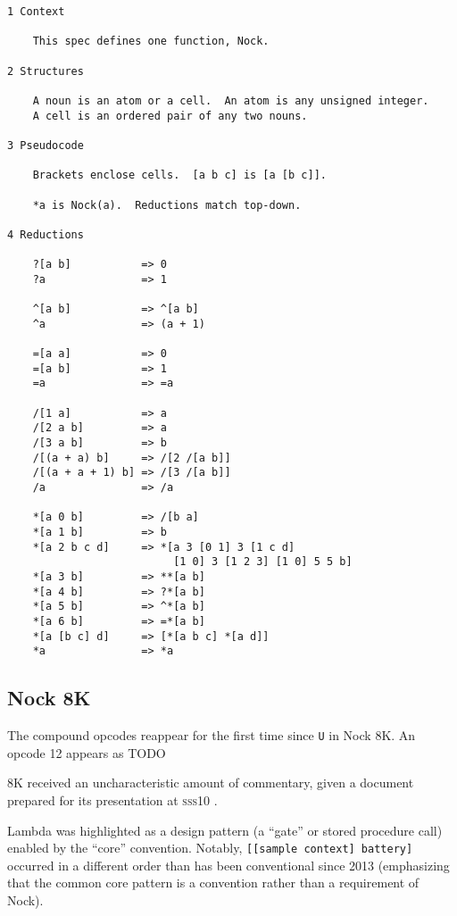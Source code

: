 \documentclass[twoside]{article}
\begin{document}
\begin{lstlisting}[label=lst:nock9k,caption={Nock 9K, \textit{terminus ad quem} 7 January 2010.},style=listingcode]
1 Context

    This spec defines one function, Nock.

2 Structures

    A noun is an atom or a cell.  An atom is any unsigned integer.
    A cell is an ordered pair of any two nouns.

3 Pseudocode

    Brackets enclose cells.  [a b c] is [a [b c]].

    *a is Nock(a).  Reductions match top-down.

4 Reductions

    ?[a b]           => 0
    ?a               => 1

    ^[a b]           => ^[a b]
    ^a               => (a + 1)

    =[a a]           => 0
    =[a b]           => 1
    =a               => =a

    /[1 a]           => a
    /[2 a b]         => a
    /[3 a b]         => b
    /[(a + a) b]     => /[2 /[a b]]
    /[(a + a + 1) b] => /[3 /[a b]]
    /a               => /a

    *[a 0 b]         => /[b a]
    *[a 1 b]         => b
    *[a 2 b c d]     => *[a 3 [0 1] 3 [1 c d]
                          [1 0] 3 [1 2 3] [1 0] 5 5 b]
    *[a 3 b]         => **[a b]
    *[a 4 b]         => ?*[a b]
    *[a 5 b]         => ^*[a b]
    *[a 6 b]         => =*[a b]
    *[a [b c] d]     => [*[a b c] *[a d]]
    *a               => *a
\end{lstlisting}

\subsection{Nock 8K}

The compound opcodes reappear for the first time since \texttt{U} in Nock 8K.  An opcode 12 appears as TODO


8K received an uncharacteristic amount of commentary, given a document prepared for its presentation at \textsc{sss10} \citep{Yarvin2010a}.

Lambda was highlighted as a design pattern (a ``gate'' or stored procedure call) enabled by the ``core'' convention.  Notably, \lstinline[style=listingcode]{[[sample context] battery]} occurred in a different order than has been conventional since 2013 (emphasizing that the common core pattern is a convention rather than a requirement of Nock).
\end{document}
